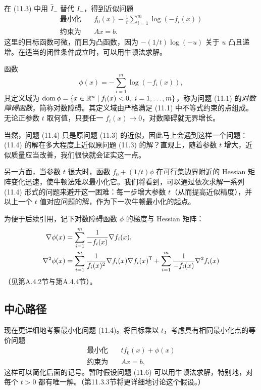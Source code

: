 在 (11.3) 中用 $\widehat I_-$ 替代 $I_-$，得到近似问题
\begin{equation}\begin{aligned}
\text{最小化}\quad&f_0(x)-\frac1t\sum_{i=1}^m\log(-f_i(x))\\
\text{约束为}\quad&Ax=b.
\end{aligned}\tag{11.4}\end{equation}
这里的目标函数可微，而且为凸函数，因为 $-(1/t)\log(-u)$ 关于 $u$ 凸且递增。在适当的闭性条件成立时，可以用牛顿法求解。

函数
\begin{equation}
\phi(x)=-\sum_{i=1}^m\log(-f_i(x)),\tag{11.5}
\end{equation}
其定义域为 $\operatorname{dom}\phi=\{x\in\mathbb R^n\mid f_i(x)<0,\ i=1,\ldots,m\}$，称为问题 (11.1) 的\emph{对数障碍函数}，简称对数障碍。其定义域由严格满足 (11.1) 中不等式约束的点组成。无论正参数 $t$ 取何值，只要任一 $f_i(x)\to0$，对数障碍就无界增长。

当然，问题 (11.4) 只是原问题 (11.3) 的近似，因此马上会遇到这样一个问题：(11.4) 的解在多大程度上近似原问题 (11.3) 的解？直观上，随着参数 $t$ 增大，近似质量应当改善，我们很快就会证实这一点。

另一方面，当参数 $t$ 很大时，函数 $f_0+(1/t)\phi$ 在可行集边界附近的 Hessian 矩阵变化迅速，使牛顿法难以最小化它。我们将看到，可以通过依次求解一系列 (11.4) 形式的问题来避开这一困难：每一步增大参数 $t$（从而提高近似精度），并以上一个 $t$ 值对应问题的解，作为下一次牛顿最小化的起点。

为便于后续引用，记下对数障碍函数 $\phi$ 的梯度与 Hessian 矩阵：
\begin{align*}
\nabla\phi(x)&=\sum_{i=1}^m\frac1{-f_i(x)}\nabla f_i(x),\\
\nabla^2\phi(x)&=\sum_{i=1}^m\frac1{f_i(x)^2}\nabla f_i(x)\nabla f_i(x)^\mathsf T
+\sum_{i=1}^m\frac1{-f_i(x)}\nabla^2 f_i(x)
\end{align*}
（见第A.4.2节与第A.4.4节）。

\subsection{中心路径}
现在更详细地考察最小化问题 (11.4)。将目标乘以 $t$，考虑具有相同最小化点的等价问题
\begin{equation}\begin{aligned}
\text{最小化}\quad&tf_0(x)+\phi(x)\\
\text{约束为}\quad&Ax=b,
\end{aligned}\tag{11.6}\end{equation}
这样可以简化后面的记号。暂时假设问题 (11.6) 可以用牛顿法求解，特别地，对每个 $t>0$ 都有唯一解。（第11.3.3节将更详细地讨论这个假设。）

